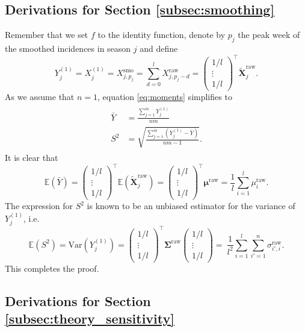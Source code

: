 \documentclass[12pt]{article}
\begin{document}
\subsection{Derivations for Section \ref{subsec:smoothing}}

Remember that we set $f$ to the identity function, denote by $p_j$ the peak week of the smoothed incidences in season $j$ and define
$$
Y_j^{(1)} = X_j^{(1)} = X^\text{smo}_{j, p_j} = \sum_{d = 0}^l X^\text{raw}_{j, p_j - d} = \begin{pmatrix} 1/l \\ \vdots \\ 1/l \end{pmatrix}^\top \tilde{\mathbf{X}}^{\text{raw}}_j.
$$
As we assume that $n = 1$, equation \eqref{eq:moments} simplifies to
\begin{align}
\begin{split}
\bar{Y} & = \frac{\sum_{j = 1}^m Y_j^{(1)}}{nm}\\
S^2 & = \sqrt{ \frac{\sum_{j = 1}^m (Y_j^{(1)}  - \bar{Y})}{nm - 1}}.
\end{split}
\end{align}
It is clear that
$$
\mathbb{E}(\bar{Y}) = \begin{pmatrix} 1/l \\ \vdots \\ 1/l \end{pmatrix}^\top \mathbb{E}(\tilde{\mathbf{X}}^{\text{raw}}_j) = \begin{pmatrix} 1/l \\ \vdots \\ 1/l \end{pmatrix}^\top \boldsymbol{\mu}^\text{raw} = \frac{1}{l}\sum_{i = 1}^l \mu^\text{raw}_i.
$$
The expression for $S^2$ is known to be an unbiased estimator for the variance of $Y_j^{(1)}$, i.e.
$$
\mathbb{E}(S^2) = \text{Var}(Y_j^{(1)}) = \begin{pmatrix} 1/l \\ \vdots \\ 1/l \end{pmatrix}^\top \mathbf{\Sigma}^\text{raw} \begin{pmatrix} 1/l \\ \vdots \\ 1/l \end{pmatrix} = \ \frac{1}{l^2} \sum_{i = 1}^l \sum_{i' = 1}^n \sigma^\text{raw}_{i', i}.
$$
This completes the proof.

\subsection{Derivations for Section \ref{subsec:theory_sensitivity}}
\label{suppl:derivations_sensitivity}
\end{document}
